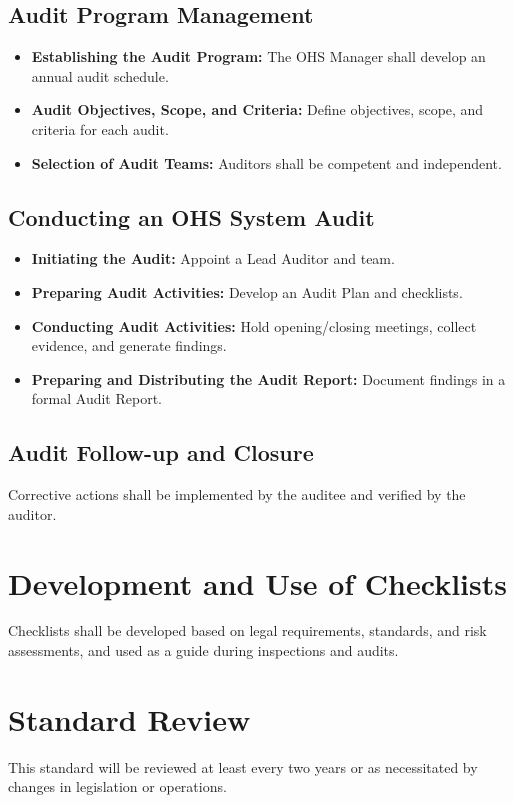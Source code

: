 \documentclass[12pt]{article}
\begin{document}
\subsection{Audit Program Management}
\begin{itemize}
    \item \textbf{Establishing the Audit Program:} The OHS Manager shall develop an annual audit schedule.
    \item \textbf{Audit Objectives, Scope, and Criteria:} Define objectives, scope, and criteria for each audit.
    \item \textbf{Selection of Audit Teams:} Auditors shall be competent and independent.
\end{itemize}

\subsection{Conducting an OHS System Audit}
\begin{itemize}
    \item \textbf{Initiating the Audit:} Appoint a Lead Auditor and team.
    \item \textbf{Preparing Audit Activities:} Develop an Audit Plan and checklists.
    \item \textbf{Conducting Audit Activities:} Hold opening/closing meetings, collect evidence, and generate findings.
    \item \textbf{Preparing and Distributing the Audit Report:} Document findings in a formal Audit Report.
\end{itemize}

\subsection{Audit Follow-up and Closure}
Corrective actions shall be implemented by the auditee and verified by the auditor.

\section{Development and Use of Checklists}
Checklists shall be developed based on legal requirements, standards, and risk assessments, and used as a guide during inspections and audits.

\section{Standard Review}
This standard will be reviewed at least every two years or as necessitated by changes in legislation or operations.
\end{document}
